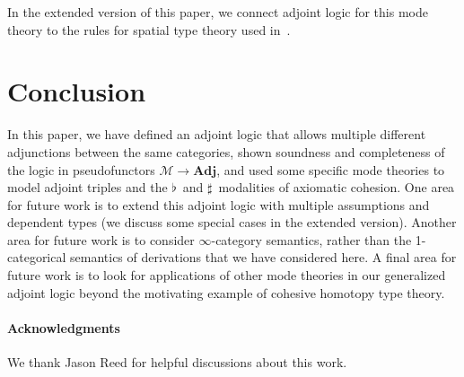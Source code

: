 \documentclass{drl-common/llncs}
\newcommand{\M}{\ensuremath{\mathcal{M}}}
\newcommand{\la}{\ensuremath{\dashv}}
\newcommand{\sh}{\text{\textesh}}
\newcommand{\Adj}{\textbf{Adj}}
\newcommand\Flat[1]{\ensuremath{\flat \, {#1}}}
\newcommand\Sharp[1]{\ensuremath{\sharp \, {#1}}}
\begin{document}
In the extended version of this paper, we connect adjoint logic for this
mode theory to the rules for spatial type theory used
in~\citet{shulman15realcohesion}.

\section{Conclusion}

In this paper, we have defined an adjoint logic that allows multiple
different adjunctions between the same categories, shown soundness and
completeness of the logic in pseudofunctors $\M \to \Adj$, and used some
specific mode theories to model adjoint triples and the $\Flat{}$ and
$\Sharp{}$ modalities of axiomatic cohesion.  One area for future work
is to extend this adjoint logic with multiple assumptions and dependent
types (we discuss some special cases in the extended version).  
Another area for future work is to consider $\infty$-category semantics,
rather than the 1-categorical semantics of derivations that we have
considered here.  A final area for future work is to look for
applications of other mode theories in our generalized adjoint logic
beyond the motivating example of cohesive homotopy type theory.

\paragraph{\textbf{Acknowledgments}} We thank Jason Reed for helpful
discussions about this work.

{ \small


}
\end{document}
